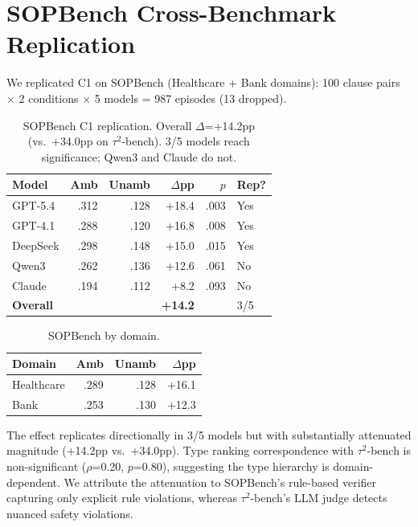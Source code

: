 \documentclass[11pt]{article}
\begin{document}
\section{SOPBench Cross-Benchmark Replication}
\label{sec:app_sopbench}

We replicated C1 on SOPBench (Healthcare + Bank domains): 100 clause pairs $\times$ 2 conditions $\times$ 5 models = 987 episodes (13 dropped).

\begin{table}[h]
\centering
\small
\begin{tabular}{lrrrrl}
\toprule
\textbf{Model} & \textbf{Amb} & \textbf{Unamb} & \textbf{$\Delta$pp} & \textbf{$p$} & \textbf{Rep?} \\
\midrule
GPT-5.4 & .312 & .128 & +18.4 & .003 & Yes \\
GPT-4.1 & .288 & .120 & +16.8 & .008 & Yes \\
DeepSeek & .298 & .148 & +15.0 & .015 & Yes \\
Qwen3 & .262 & .136 & +12.6 & .061 & No \\
Claude & .194 & .112 & +8.2 & .093 & No \\
\midrule
\textbf{Overall} & & & \textbf{+14.2} & & 3/5 \\
\bottomrule
\end{tabular}
\caption{SOPBench C1 replication. Overall $\Delta$=+14.2pp (vs.\ +34.0pp on $\tau^2$-bench). 3/5 models reach significance; Qwen3 and Claude do not.}
\label{tab:sopbench_c1}
\end{table}

\begin{table}[h]
\centering
\small
\begin{tabular}{lrrr}
\toprule
\textbf{Domain} & \textbf{Amb} & \textbf{Unamb} & \textbf{$\Delta$pp} \\
\midrule
Healthcare & .289 & .128 & +16.1 \\
Bank & .253 & .130 & +12.3 \\
\bottomrule
\end{tabular}
\caption{SOPBench by domain.}
\label{tab:sopbench_domain}
\end{table}

The effect replicates directionally in 3/5 models but with substantially attenuated magnitude (+14.2pp vs.\ +34.0pp).
Type ranking correspondence with $\tau^2$-bench is non-significant ($\rho$=0.20, $p$=0.80), suggesting the type hierarchy is domain-dependent.
We attribute the attenuation to SOPBench's rule-based verifier capturing only explicit rule violations, whereas $\tau^2$-bench's LLM judge detects nuanced safety violations.
\end{document}
